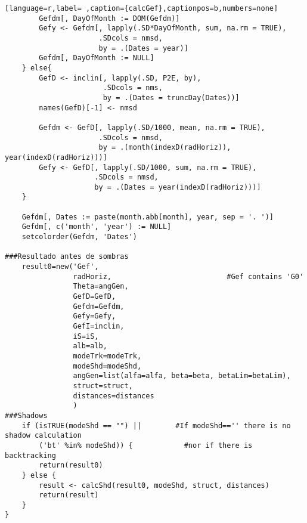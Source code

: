 \begin{lstlisting}[language=r,label= ,caption={calcGef},captionpos=b,numbers=none]
        Gefdm[, DayOfMonth := DOM(Gefdm)]
        Gefy <- Gefdm[, lapply(.SD*DayOfMonth, sum, na.rm = TRUE),
                      .SDcols = nmsd,
                      by = .(Dates = year)]
        Gefdm[, DayOfMonth := NULL]
    } else{
        GefD <- inclin[, lapply(.SD, P2E, by),
                       .SDcols = nms,
                       by = .(Dates = truncDay(Dates))]
        names(GefD)[-1] <- nmsd

        Gefdm <- GefD[, lapply(.SD/1000, mean, na.rm = TRUE),
                      .SDcols = nmsd,
                      by = .(month(indexD(radHoriz)), year(indexD(radHoriz)))]
        Gefy <- GefD[, lapply(.SD/1000, sum, na.rm = TRUE),
                     .SDcols = nmsd,
                     by = .(Dates = year(indexD(radHoriz)))]
    }

    Gefdm[, Dates := paste(month.abb[month], year, sep = '. ')]
    Gefdm[, c('month', 'year') := NULL]
    setcolorder(Gefdm, 'Dates')

###Resultado antes de sombras
    result0=new('Gef',
                radHoriz,                           #Gef contains 'G0'
                Theta=angGen,
                GefD=GefD,
                Gefdm=Gefdm,
                Gefy=Gefy,
                GefI=inclin,
                iS=iS,
                alb=alb,
                modeTrk=modeTrk,
                modeShd=modeShd,
                angGen=list(alfa=alfa, beta=beta, betaLim=betaLim),
                struct=struct,
                distances=distances
                )
###Shadows
    if (isTRUE(modeShd == "") ||        #If modeShd=='' there is no shadow calculation
        ('bt' %in% modeShd)) {            #nor if there is backtracking
        return(result0)
    } else {
        result <- calcShd(result0, modeShd, struct, distances)
        return(result)
    }
}
\end{lstlisting}
